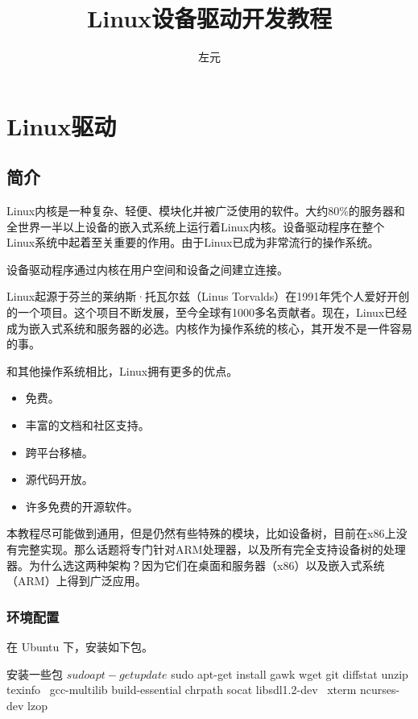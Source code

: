 \documentclass[lang=cn,newtx,10pt,scheme=chinese]{elegantbook}
\title{Linux设备驱动开发教程}
\author{左元}
\begin{document}
\maketitle
\frontmatter

\tableofcontents

\mainmatter

\part{Linux驱动}

\chapter{简介}

Linux内核是一种复杂、轻便、模块化并被广泛使用的软件。大约80\%的服务器和全世界一半以上设备的嵌入式系统上运行着Linux内核。设备驱动程序在整个Linux系统中起着至关重要的作用。由于Linux已成为非常流行的操作系统。

设备驱动程序通过内核在用户空间和设备之间建立连接。

Linux起源于芬兰的莱纳斯·托瓦尔兹（Linus Torvalds）在1991年凭个人爱好开创的一个项目。这个项目不断发展，至今全球有1000多名贡献者。现在，Linux已经成为嵌入式系统和服务器的必选。内核作为操作系统的核心，其开发不是一件容易的事。

和其他操作系统相比，Linux拥有更多的优点。

\begin{itemize}
\item 免费。
\item 丰富的文档和社区支持。
\item 跨平台移植。
\item 源代码开放。
\item 许多免费的开源软件。
\end{itemize}

本教程尽可能做到通用，但是仍然有些特殊的模块，比如设备树，目前在x86上没有完整实现。那么话题将专门针对ARM处理器，以及所有完全支持设备树的处理器。为什么选这两种架构？因为它们在桌面和服务器（x86）以及嵌入式系统（ARM）上得到广泛应用。

\section{环境配置}

在 Ubuntu 下，安装如下包。

\begin{mycode}{安装一些包}
$ sudo apt-get update
$ sudo apt-get install gawk wget git diffstat
unzip texinfo \
gcc-multilib build-essential chrpath socat
libsdl1.2-dev \
xterm ncurses-dev lzop
\end{mycode}
\end{document}

